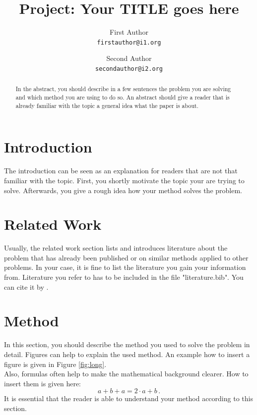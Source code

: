 \documentclass[10pt,twocolumn,letterpaper]{article}
\begin{document}
\title{Project: Your TITLE goes here}

\author{First Author\\
{\tt\small firstauthor@i1.org}
\and
Second Author\\
{\tt\small secondauthor@i2.org}
}

\maketitle

\begin{abstract}
   In the abstract, you should describe in a few sentences the problem you are solving and which method you are using to do so. An abstract should give a reader that is already familiar with the topic a general idea what the paper is about. 
\end{abstract}

\section{Introduction}
The introduction can be seen as an explanation for readers that are not that familiar with the topic. First, you shortly motivate the topic your are trying to solve. Afterwards, you give a rough idea how your method solves the problem. 


\section{Related Work}
Usually, the related work section lists and introduces literature about the problem that has already been published or on similar methods applied to other problems. In your case, it is fine to list the literature you gain your information from. Literature you refer to has to be included in the file "literature.bib". You can cite it by \cite{ren2015faster}.

\section{Method}
In this section, you should describe the method you used to solve the problem in detail. Figures can help to explain the used method. An example how to insert a figure is given in Figure \ref{fig:long}. \\
Also, formulas often help to make the mathematical background clearer. How to insert them is given here: 
$$a + b + a = 2 \cdot a + b\,.$$
It is essential that the reader is able to understand your method according to this section.
\end{document}
